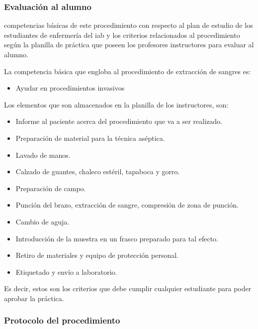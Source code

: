 \subsubsection{Evaluación al alumno}

 competencias básicas de este
procedimiento con respecto al plan de estudio de los estudiantes de enfermería
del \Gls{iab} y los criterios relacionados al procedimiento según la planilla de
práctica que poseen los profesores instructores para evaluar al alumno.

La competencia básica que engloba al procedimiento de extracción de sangres es:

\begin{itemize}
\item Ayudar en procedimientos invasivos
\end{itemize}

Los elementos que son almacenados en la planilla de los instructores, son:

\begin{itemize}
\item Informe al paciente acerca del procedimiento que va a ser
    realizado.
\item Preparación de material para la técnica aséptica.
\item Lavado de manos.
\item Calzado de guantes, chaleco estéril, tapaboca y gorro.
\item Preparación de campo.
\item Punción del brazo, extracción de sangre, compresión de zona de punción.
\item Cambio de aguja.
\item Introducción de la muestra en un frasco preparado para tal efecto.
\item Retiro de materiales y equipo de protección personal.
\item Etiquetado y envío a laboratorio.
\end{itemize}

Es decir, estos son los criterios que debe cumplir cualquier estudiante
para poder aprobar la práctica.

\subsubsection{Protocolo del procedimiento}
\label{sec:hemocultivo_protocolo}

